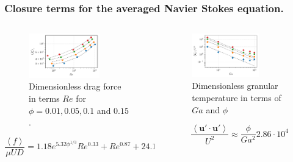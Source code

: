 \documentclass{sintefbeamer}
\newcommand{\avg}[1]{\left<#1\right>}
\begin{document}
\begin{frame}
  \frametitle{Closure terms for the averaged Navier Stokes equation.}
\begin{columns}
  \begin{column}{0.5\textwidth}
    \begin{figure}
      \includegraphics[width=0.7\textwidth]{image/HOMOGENEOUS/fCA/FH_mu_Re.pdf}
      \caption{Dimensionless drag force in terms $Re$ for $\phi = 0.01, 0.05, 0.1$ and $0.15$.}
    \end{figure}
    \begin{equation*}
      \frac{\avg{f}}{\mu UD} 
      = 1.18 e^{5.32\phi^{1/3}}  Re^{0.33}  + Re^{0.87} +24.12
    \end{equation*}
  \end{column}
  \begin{column}{0.5\textwidth}
    \begin{figure}[h!]
      \centering
      \includegraphics[width=0.7\textwidth]{image/HOMOGENEOUS/fPA/Talpha.pdf}
      \caption{Dimensionless granular temperature in terms of $Ga$ and $\phi$}
  \end{figure}
  	\begin{equation}
    \frac{\avg{\textbf{u}'\cdot \textbf{u}'}}{U^2}  
    \approx \frac{\phi}{Ga^2} 2.86\cdot10^{4} 
    \label{eq:Talpha_scaling}
	\end{equation}
  \end{column}
\end{columns}

\end{frame}
\end{document}
